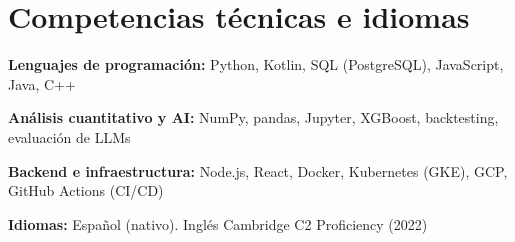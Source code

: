 \documentclass[10pt,letterpaper]{article}
\newenvironment{cvblock}{%
  \begin{list}{}{%
    \setlength{\leftmargin}{10.8pt}%
    \setlength{\rightmargin}{5.4pt}%
    \setlength{\topsep}{0pt}%
    \setlength{\partopsep}{0pt}%
    \setlength{\parsep}{0pt}%
    \setlength{\itemsep}{0pt}%
  }\item[]%
}{\end{list}}
\begin{document}
\section{Competencias técnicas e idiomas}
\begin{cvblock}
  \textbf{Lenguajes de programación:} Python, Kotlin, SQL (PostgreSQL), JavaScript, Java, C++\par
  \textbf{Análisis cuantitativo y AI:} NumPy, pandas, Jupyter, XGBoost, backtesting, evaluación de LLMs\par
  \textbf{Backend e infraestructura:} Node.js, React, Docker, Kubernetes (GKE), GCP, GitHub Actions (CI/CD)\par
  \textbf{Idiomas:} Español (nativo). Inglés Cambridge C2 Proficiency (2022)
\end{cvblock}
\end{document}
